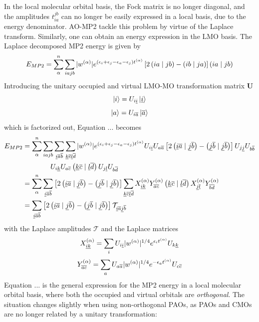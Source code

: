 In the local molecular orbital basis, the Fock matrix is no longer diagonal, and the amplitudes $t_{ia}^{jb}$ can no longer be easily expressed in a local basis, due to the energy denominator. AO-MP2 tackle this problem by virtue of the Laplace transform. Similarly, one can obtain an energy expression in the LMO basis. The Laplace decomposed MP2 energy is given by
\begin{equation}
E_{MP2} = \sum_{\alpha}^{n} \sum_{iajb} |w^{(\alpha)}| e^{(\epsilon_i + \epsilon_j - \epsilon_a - \epsilon_j)t^{(\alpha)}} \left[2\left( ia \mid jb \right) - \left( ib \mid ja \right)\right] \left( ia \mid jb \right)  
\end{equation}
\noindent Introducing the unitary occupied and virtual LMO-MO transformation matrix $\mathbf{U}$ 
\begin{equation}
\ket{i} = U_{i\underline{i}} \ket{\underline{i}}
\end{equation} 
\begin{equation}
\ket{a} = U_{i\overline{a}} \ket{\overline{a}}
\end{equation}
\noindent which is factorized out, Equation ... becomes
\begin{equation}
\begin{split}
E_{MP2} &= \sum_{\alpha}^{n} \sum_{iajb} \sum_{\underline{i}\overline{a}\overline{b}} \sum_{\underline{k}\overline{c}\underline{l}\overline{d}} |w^{(\alpha)}| e^{(\epsilon_i + \epsilon_j - \epsilon_a - \epsilon_j)t^{(\alpha)}} U_{i\underline{i}} U_{a\overline{a}} \left[2\left( \underline{i}\overline{a} \mid \underline{j}\overline{b} \right) - \left( \underline{j}\overline{b} \mid \underline{j}\overline{b} \right)\right] U_{j\underline{j}} U_{b\overline{b}} \\
& \qquad \qquad U_{i\underline{k}} U_{a\overline{c}} \left( \underline{k}\overline{c} \mid \underline{l}\overline{d} \right) U_{j\underline{l}} U_{b\overline{d}} \\  
&= \sum_{\alpha}^{n} \sum_{\underline{i}\overline{a}\overline{b}} \left[2\left( \underline{i}\overline{a} \mid \underline{j}\overline{b} \right) - \left( \underline{j}\overline{b} \mid \underline{j}\overline{b} \right)\right] \sum_{\underline{k}\overline{c}\underline{l}\overline{d}} X_{\underline{i}\underline{k}}^{(\alpha)} Y_{\overline{a}\overline{c}}^{(\alpha)} \left( \underline{k}\overline{c} \mid \underline{l}\overline{d} \right) X_{\underline{j}\underline{l}}^{(\alpha)} Y_{\overline{b}\overline{d}}^{(\alpha)} \\
&= \sum_{\underline{i}\overline{a}\overline{b}} \left[2\left( \underline{i}\overline{a} \mid \underline{j}\overline{b} \right) - \left( \underline{j}\overline{b} \mid \underline{j}\overline{b} \right)\right] \mathcal{T}_{\underline{i}\overline{a}\underline{j}\overline{b}}
\end{split}
\end{equation}
\noindent with the Laplace amplitudes $\mathcal{T}$ and the Laplace matrices
\begin{equation}
X_{\underline{i}\underline{k}}^{(\alpha)} = \sum_i U_{i\underline{i}} |w^{(\alpha)}|^{1/4} e^{\epsilon_i t^{(\alpha)}} U_{k\underline{k}}
\end{equation}
\begin{equation}
Y_{\overline{a}\overline{c}}^{(\alpha)} = \sum_a U_{a\overline{a}} |w^{(\alpha)}|^{1/4} e^{-\epsilon_a t^{(\alpha)}} U_{c\overline{c}}
\end{equation}
\noindent Equation ... is the general expression for the MP2 energy in a local molecular orbital basis, where both the occupied and virtual orbitals are \emph{orthogonal}. The situation changes slightly when using non-orthogonal PAOs, as PAOs and CMOs are no longer related by a unitary transformation:
